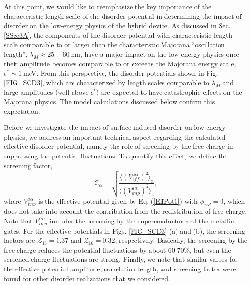 \documentclass[aps,prmaterials,twocolumn,superscriptaddress,longbibliography]{revtex4-2}
\begin{document}
At this point, we would like to reemphasize the key importance of the characteristic length scale of the disorder potential in determining the impact of disorder on the low-energy physics of the hybrid device. As discussed in Sec. \ref{SSec3A}, 
the components of the disorder potential with characteristic length scale comparable to or larger than the characteristic Majorana ``oscillation length'', 
$\lambda_M\approx 25-60~$nm,  have a major impact on the low-energy physics once their amplitude becomes comparable to or exceeds the Majorana energy scale, $\epsilon^*\sim 1~$meV. From this perspective, the disorder potentials shown in Fig. \ref{FIG_SCD3}, which are characterized by length scales comparable to $\lambda_M$ and large amplitudes (well above $\epsilon^*$) are expected to have catastrophic effects on the Majorana physics. The model calculations discussed below confirm this expectation.     

Before we investigate the impact of surface-induced disorder on low-energy physics, we address an important technical aspect regarding the calculated effective disorder potential, namely the role of screening by the free charge in suppressing the potential fluctuations. To quantify this effect, we define the screening factor,
\begin{equation}
    \mathcal{Z}_\alpha = \sqrt{
  \frac{\bigg\langle \left(V^{\alpha\alpha}_{eff}\right)^2 \bigg\rangle_z
    }
    {\bigg\langle \left(V^{\alpha\alpha}_{imp}\right)^2 \bigg\rangle_z}
    },
\end{equation}
where $V^{\alpha\alpha}_{imp}$ is the effective potential given by Eq. (\ref{EffPot0}) with $\phi_{red}=0$, which does not take into account the contribution from the redistribution of free charge. Note that $V^{\alpha\alpha}_{imp}$ includes the screening by the superconductor and the metallic gates. For the effective potentials in Figs. \ref{FIG_SCD3} (a) and (b), the screening factors are $\mathcal{Z}_{13} = 0.37$ and $\mathcal{Z}_{16} = 0.32$, respectively. Basically, the screening by the free charge reduces the potential fluctuations by about $60$-$70$\%, but even the screened charge fluctuations are strong. Finally, we note that similar values for the effective potential amplitude, correlation length, and screening factor were found for other disorder realizations that we considered. 
\end{document}
